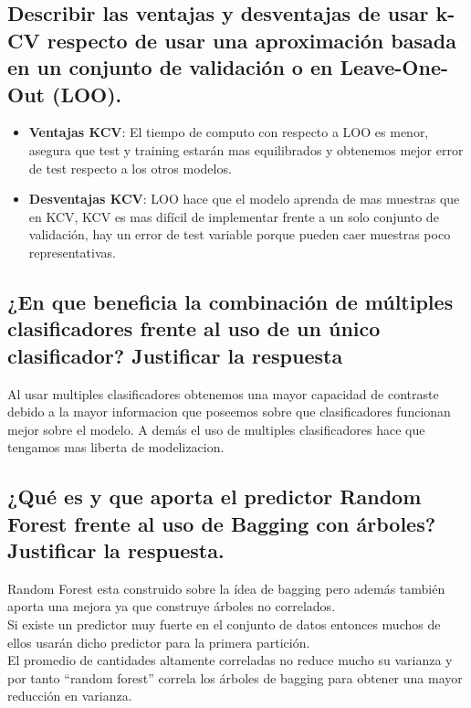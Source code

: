 \subsection{Describir las ventajas y desventajas de usar k-CV respecto de usar una aproximación basada en un conjunto de validación o en Leave-One-Out (LOO).}

\begin{itemize}

\item \textbf{Ventajas KCV}: El tiempo de computo con respecto a LOO es menor, asegura que test y training estarán mas equilibrados y obtenemos mejor error de test respecto a los otros modelos.

\item \textbf{Desventajas KCV}:  LOO hace que el modelo aprenda de mas muestras que en KCV, KCV es mas difícil de implementar frente a un solo conjunto de validación, hay un error de test variable porque pueden caer muestras poco representativas.


\end{itemize}

\subsection{¿En que beneficia la combinación de múltiples clasificadores frente al uso de un único clasificador? Justificar la respuesta}

Al usar multiples clasificadores obtenemos una mayor capacidad de contraste debido a la mayor informacion que poseemos sobre que clasificadores funcionan mejor sobre el modelo. A demás el uso de multiples clasificadores hace que tengamos mas liberta de modelizacion.

\subsection{¿Qué es y que aporta el predictor Random Forest frente al uso de  Bagging con árboles?
Justificar la respuesta.}

Random Forest esta construido sobre la ídea de bagging pero además también aporta una mejora ya que construye árboles no correlados.\\

Si existe un predictor muy fuerte en el conjunto de datos entonces muchos de ellos usarán dicho predictor para la primera partición.\\

El promedio de cantidades altamente correladas no reduce mucho su varianza y por tanto “random forest” correla los árboles de bagging para obtener una mayor reducción en varianza.\\


